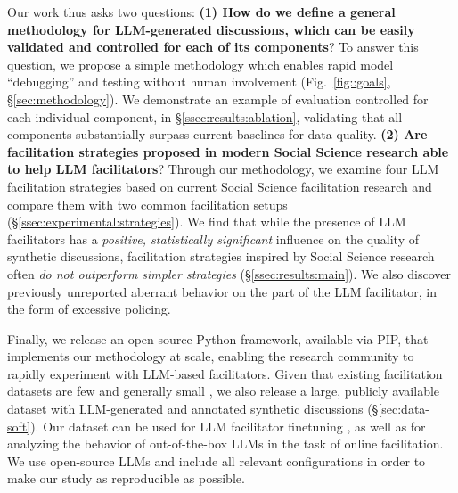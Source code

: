 Our work thus asks two questions: \textbf{(1) How do we define a general methodology for LLM-generated discussions, which can be easily validated and controlled for each of its components}? To answer this question, we propose a simple methodology which enables rapid model “debugging” and testing without human involvement (Fig.~\ref{fig::goals}, \S\ref{sec:methodology}). We demonstrate an example of evaluation controlled for each individual component, in \S\ref{ssec:results:ablation}, validating that all components substantially surpass current baselines for data quality. \textbf{(2) Are facilitation strategies proposed in modern Social Science research able to help LLM facilitators}? Through our methodology, we examine four LLM facilitation strategies based on current Social Science facilitation research and compare them with two common facilitation setups (\S\ref{ssec:experimental:strategies}). We find that while the presence of LLM facilitators has a \emph{positive, statistically significant} influence on the quality of synthetic discussions, facilitation strategies inspired by Social Science research often \emph{do not outperform simpler strategies} (\S\ref{ssec:results:main}). We also discover previously unreported aberrant behavior on the part of the LLM facilitator, in the form of excessive policing.

Finally, we release an open-source Python framework, available via PIP, that implements our methodology at scale, enabling the research community to rapidly experiment with LLM-based facilitators. Given that existing facilitation datasets are few and generally small \citep{korre2025evaluation}, we also release \vmd a large, publicly available dataset with LLM-generated and annotated synthetic discussions (\S\ref{sec:data-soft}). Our dataset can be used for LLM facilitator finetuning \cite{ulmer2024}, as well as for analyzing the behavior of out-of-the-box LLMs in the task of online facilitation. We use open-source LLMs and include all relevant configurations in order to make our study as reproducible as possible.
